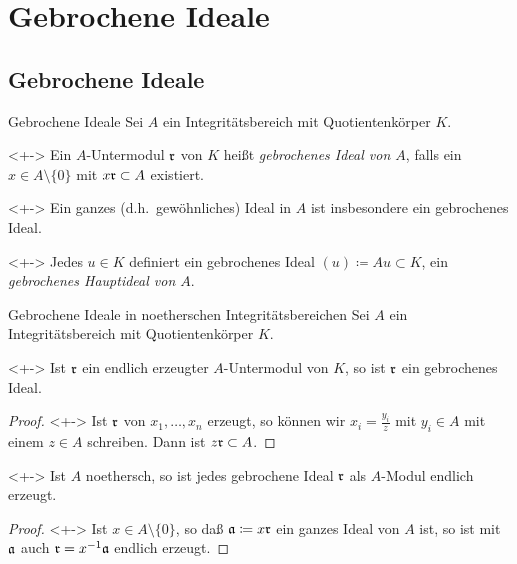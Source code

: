 \section{Gebrochene Ideale}

\subsection{Gebrochene Ideale}

\begin{frame}{Gebrochene Ideale}
	Sei \(A\) ein Integritätsbereich mit Quotientenkörper \(K\).
	\begin{definition}<+->
		Ein \(A\)-Untermodul \(\mathfrak{r}\) von \(K\) heißt \emph{gebrochenes Ideal
		von \(A\)}, falls ein \(x \in A \setminus \{0\}\) mit \(x \mathfrak{r}
		\subset A\) existiert.
	\end{definition}
	\begin{example}<+->
		Ein ganzes (d.h.\ gewöhnliches) Ideal in \(A\) ist insbesondere
		ein gebrochenes Ideal.
	\end{example}
	\begin{example}<+->
		Jedes \(u \in K\) definiert ein gebrochenes Ideal \((u) \coloneqq
		A u \subset K\), ein \emph{gebrochenes Hauptideal von \(A\)}.
	\end{example}
\end{frame}

\begin{frame}{Gebrochene Ideale in noetherschen Integritätsbereichen}
	Sei \(A\) ein Integritätsbereich mit Quotientenkörper \(K\).
	\begin{proposition}<+->
		Ist \(\mathfrak{r}\) ein endlich erzeugter \(A\)-Untermodul von \(K\),
		so ist \(\mathfrak{r}\) ein gebrochenes Ideal.
	\end{proposition}
	\begin{proof}<+->
		Ist \(\mathfrak{r}\) von \(x_1, \dotsc, x_n\) erzeugt, so können wir
		\(x_i = \frac{y_i}z\) mit \(y_i \in A\) mit einem \(z \in A\) schreiben.
		Dann ist \(z \mathfrak{r} \subset A\).
	\end{proof}
	\begin{proposition}<+->
		Ist \(A\) noethersch, so ist jedes gebrochene Ideal \(\mathfrak{r}\)
		als \(A\)-Modul endlich erzeugt.
	\end{proposition}
	\begin{proof}<+->
		Ist \(x \in A \setminus \{0\}\), so daß \(\mathfrak{a} \coloneqq x \mathfrak{r}\)
		ein ganzes Ideal von \(A\) ist, so ist mit \(\mathfrak{a}\) auch
		\(\mathfrak{r} = x^{-1} \mathfrak{a}\) endlich erzeugt.
	\end{proof}
\end{frame}

